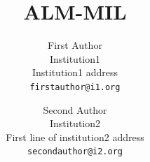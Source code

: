 \documentclass[10pt,twocolumn,letterpaper]{article}
\title{ALM-MIL}
\author{First Author\\
Institution1\\
Institution1 address\\
{\tt\small firstauthor@i1.org}
\and
Second Author\\
Institution2\\
First line of institution2 address\\
{\tt\small secondauthor@i2.org}
}
\begin{document}
\maketitle
% 
\begin{nolinenumbers}
  \par
\end{nolinenumbers}





% 
% 
\clearpage
{
    \small
    
    
}

% 
\end{document}
